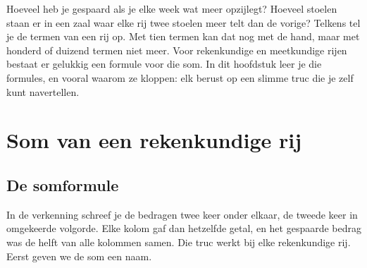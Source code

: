 %



Hoeveel heb je gespaard als je elke week wat meer opzijlegt? Hoeveel stoelen staan er in een zaal waar elke rij twee stoelen meer telt dan de vorige? Telkens tel je de termen van een rij op. Met tien termen kan dat nog met de hand, maar met honderd of duizend termen niet meer. Voor rekenkundige en meetkundige rijen bestaat er gelukkig een formule voor die som. In dit hoofdstuk leer je die formules, en vooral waarom ze kloppen: elk berust op een slimme truc die je zelf kunt navertellen.

\begin{oefeningen}[Start]

\end{oefeningen}


\section{Som van een rekenkundige rij}

\subsection{De somformule}

In de verkenning schreef je de bedragen twee keer onder elkaar, de tweede keer in omgekeerde volgorde. Elke kolom gaf dan hetzelfde getal, en het gespaarde bedrag was de helft van alle kolommen samen. Die truc werkt bij elke rekenkundige rij. Eerst geven we de som een naam.

